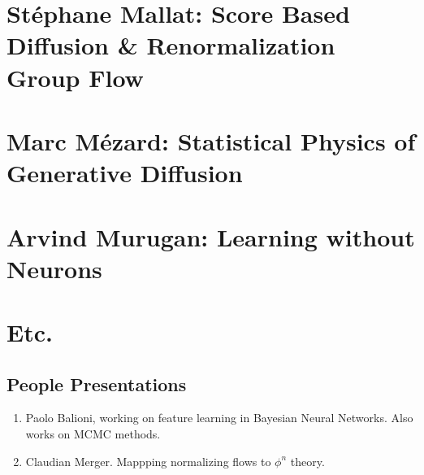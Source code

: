 \documentclass[12pt,fleqn]{book}
\numberwithin{equation}{section} %
\begin{document}
\chapter{St\'ephane Mallat: Score Based Diffusion \& Renormalization Group Flow}

\newpage

\chapter{Marc M\'ezard: Statistical Physics of Generative Diffusion}

\newpage

\chapter{Arvind Murugan: Learning without Neurons}

\newpage

\chapter{Etc.}

\section{People Presentations} 
\begin{enumerate}
	\item Paolo Balioni, working on feature learning in Bayesian Neural Networks. Also works on MCMC methods.
	\item Claudian Merger. Mappping normalizing flows to $\phi^n$ theory.
\end{enumerate}
\end{document}
